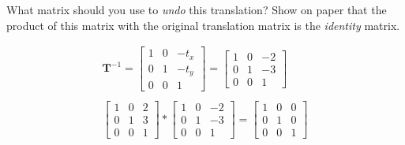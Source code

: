 What matrix should you use to \emph{undo} this translation? Show on paper that the product of this matrix with the original translation matrix is the \emph{identity} matrix.

\begin{solution}
    \begin{align*}
        \boldsymbol{T}^{-1} = \begin{bmatrix}
            1 & 0 & -t_x \\
            0 & 1 & -t_y \\
            0 & 0 & 1
        \end{bmatrix} = \begin{bmatrix}
            1 & 0 & -2 \\
            0 & 1 & -3 \\
            0 & 0 & 1
        \end{bmatrix} \\ \\
        \begin{bmatrix}
            1 & 0 & 2 \\
            0 & 1 & 3 \\
            0 & 0 & 1
        \end{bmatrix} * \begin{bmatrix}
            1 & 0 & -2 \\
            0 & 1 & -3 \\
            0 & 0 & 1
        \end{bmatrix} = \begin{bmatrix}
            1 & 0 & 0 \\
            0 & 1 & 0 \\
            0 & 0 & 1
        \end{bmatrix}
    \end{align*}

\end{solution}